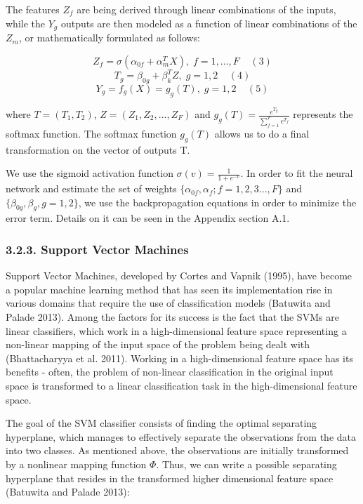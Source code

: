 \documentclass[12pt,]{article}
\begin{document}
The features \(Z_f\) are being derived through linear combinations of
the inputs, while the \(Y_g\) outputs are then modeled as a function of
linear combinations of the \(Z_m\), or mathematically formulated as
follows:

\[Z_f=\sigma(\alpha_{0f}+\alpha_{m}^{T}X),\;f=1,...,F\;\;\;\;(3)\]
\[T_g=\beta_{0g}+\beta_{k}^{T}Z,\;g=1,2\;\;\;\;(4)\]
\[Y_g = f_{g}(X)=g_g(T),\;g=1,2\;\;\;\;(5)\]

where \(T=(T_1,T_2)\), \(Z=(Z_1,Z_2,...,Z_F)\) and
\(g_g(T)=\frac{e^{T_g}}{\sum_{f=1}^{F}e^{T_f}}\) represents the softmax
function. The softmax function \(g_g(T)\) allows us to do a final
transformation on the vector of outputs T.

We use the sigmoid activation function \(\sigma(v)=\frac{1}{1+e^{-v}}\).
In order to fit the neural network and estimate the set of weights
\(\{\alpha_{0f},\alpha_{f};f=1,2,3...,F\}\) and
\(\{\beta_{0g},\beta_{g},g=1,2\}\), we use the backpropagation equations
in order to minimize the error term. Details on it can be seen in the
Appendix section A.1.

\hypertarget{support-vector-machines}{%
\subsubsection{3.2.3. Support Vector
Machines}\label{support-vector-machines}}

Support Vector Machines, developed by Cortes and Vapnik (1995), have
become a popular machine learning method that has seen its
implementation rise in various domains that require the use of
classification models (Batuwita and Palade 2013). Among the factors for
its success is the fact that the SVMs are linear classifiers, which work
in a high-dimensional feature space representing a non-linear mapping of
the input space of the problem being dealt with (Bhattacharyya et al.
2011). Working in a high-dimensional feature space has its benefits -
often, the problem of non-linear classification in the original input
space is transformed to a linear classification task in the
high-dimensional feature space.

The goal of the SVM classifier consists of finding the optimal
separating hyperplane, which manages to effectively separate the
observations from the data into two classes. As mentioned above, the
observations are initially transformed by a nonlinear mapping function
\(\Phi\). Thus, we can write a possible separating hyperplane that
resides in the transformed higher dimensional feature space (Batuwita
and Palade 2013):
\end{document}
